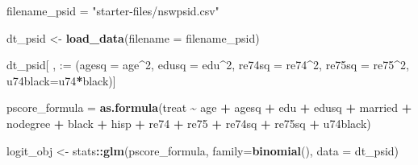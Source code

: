 \documentclass[
]{article}
\newenvironment{Shaded}{\begin{snugshade}}{\end{snugshade}}
\newcommand{\AttributeTok}[1]{\textcolor[rgb]{0.13,0.29,0.53}{#1}}
\newcommand{\DecValTok}[1]{\textcolor[rgb]{0.00,0.00,0.81}{#1}}
\newcommand{\FunctionTok}[1]{\textcolor[rgb]{0.13,0.29,0.53}{\textbf{#1}}}
\newcommand{\NormalTok}[1]{#1}
\newcommand{\OtherTok}[1]{\textcolor[rgb]{0.56,0.35,0.01}{#1}}
\newcommand{\SpecialCharTok}[1]{\textcolor[rgb]{0.81,0.36,0.00}{\textbf{#1}}}
\newcommand{\StringTok}[1]{\textcolor[rgb]{0.31,0.60,0.02}{#1}}
\begin{document}
\begin{Shaded}
\begin{Highlighting}[]
\NormalTok{filename\_psid }\OtherTok{=} \StringTok{"starter{-}files/nswpsid.csv"}

\NormalTok{dt\_psid }\OtherTok{\textless{}{-}} \FunctionTok{load\_data}\NormalTok{(}\AttributeTok{filename =}\NormalTok{ filename\_psid)}

\NormalTok{dt\_psid[ , }\StringTok{\textasciigrave{}}\AttributeTok{:=}\StringTok{\textasciigrave{}}\NormalTok{ (}\AttributeTok{agesq =}\NormalTok{ age}\SpecialCharTok{\^{}}\DecValTok{2}\NormalTok{, }\AttributeTok{edusq =}\NormalTok{ edu}\SpecialCharTok{\^{}}\DecValTok{2}\NormalTok{, }\AttributeTok{re74sq =}\NormalTok{ re74}\SpecialCharTok{\^{}}\DecValTok{2}\NormalTok{, }\AttributeTok{re75sq =}\NormalTok{ re75}\SpecialCharTok{\^{}}\DecValTok{2}\NormalTok{, }\AttributeTok{u74black=}\NormalTok{u74}\SpecialCharTok{*}\NormalTok{black)]}

\NormalTok{pscore\_formula }\OtherTok{=} \FunctionTok{as.formula}\NormalTok{(treat }\SpecialCharTok{\textasciitilde{}}\NormalTok{ age }\SpecialCharTok{+}\NormalTok{ agesq }\SpecialCharTok{+}\NormalTok{ edu }\SpecialCharTok{+}\NormalTok{ edusq }\SpecialCharTok{+} 
\NormalTok{                              married }\SpecialCharTok{+}\NormalTok{ nodegree }\SpecialCharTok{+}\NormalTok{ black }\SpecialCharTok{+}\NormalTok{ hisp }\SpecialCharTok{+} 
\NormalTok{                              re74 }\SpecialCharTok{+}\NormalTok{ re75 }\SpecialCharTok{+}\NormalTok{ re74sq }\SpecialCharTok{+}\NormalTok{ re75sq }\SpecialCharTok{+}\NormalTok{ u74black)}
\end{Highlighting}
\end{Shaded}

\begin{Shaded}
\begin{Highlighting}[]
\NormalTok{logit\_obj }\OtherTok{\textless{}{-}}\NormalTok{ stats}\SpecialCharTok{::}\FunctionTok{glm}\NormalTok{(pscore\_formula, }\AttributeTok{family=}\FunctionTok{binomial}\NormalTok{(), }\AttributeTok{data =}\NormalTok{ dt\_psid)}
\end{Highlighting}
\end{Shaded}

\begin{Shaded}
\end{Shaded}
\end{document}
